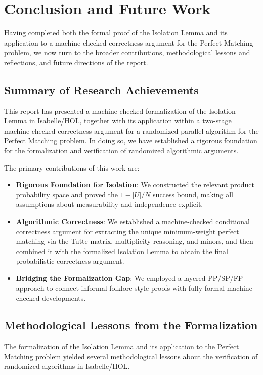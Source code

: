 \chapter{Conclusion and Future Work}
\label{chp:conclusion}

Having completed both the formal proof of the Isolation Lemma and its application to a machine-checked correctness argument for the Perfect Matching problem, we now turn to the broader contributions, methodological lessons and reflections, and future directions of the report.

\section{Summary of Research Achievements}
This report has presented a machine-checked formalization of the Isolation Lemma in Isabelle/HOL, together with its application within a two-stage machine-checked correctness argument for a randomized parallel algorithm for the Perfect Matching problem.
In doing so, we have established a rigorous foundation for the formalization and verification of randomized algorithmic arguments.

The primary contributions of this work are:
\begin{itemize}
    \item \textbf{Rigorous Foundation for Isolation}:
    We constructed the relevant product probability space and proved the $1 - |U|/N$ success bound, making all assumptions about measurability and independence explicit.
    \item \textbf{Algorithmic Correctness}:
    We established a machine-checked conditional correctness argument for extracting the unique minimum-weight perfect matching via the Tutte matrix, multiplicity reasoning, and minors, and then combined it with the formalized Isolation Lemma to obtain the final probabilistic correctness argument.
    \item \textbf{Bridging the Formalization Gap}:
    We employed a layered PP/SP/FP approach to connect informal folklore-style proofs with fully formal machine-checked developments.
\end{itemize}

\section{Methodological Lessons from the Formalization}
\label{sec:lessons}

The formalization of the Isolation Lemma and its application to the Perfect Matching problem yielded several methodological lessons about the verification of randomized algorithms in Isabelle/HOL.

